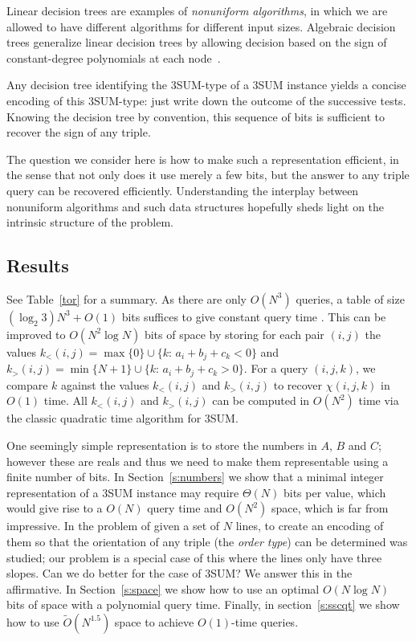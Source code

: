 Linear decision trees are examples of {\em nonuniform algorithms}, in which we
are allowed to have different algorithms for different input sizes.
Algebraic decision trees generalize linear decision trees
by allowing decision based on the sign of constant-degree polynomials at each
node~\cite{SY82}.

Any decision tree identifying the 3SUM-type of a 3SUM instance yields a concise
encoding of this 3SUM-type:
just write down the outcome of the successive tests. Knowing the decision tree
by convention, this sequence of bits is
sufficient to recover the sign of any triple.

The question we consider here is how to make such a representation efficient,
in the sense that not only does it use merely a few bits, but the answer to any
triple query can be recovered efficiently. Understanding the interplay between
nonuniform algorithms and such data structures hopefully sheds light on the
intrinsic structure of the problem.

\subsection{Results}

See Table~\ref{tor} for a summary. As there are only $O(N^3)$ queries, a table
of size $(\log_2 3) N^3 + O(1)$ bits suffices to give constant query time
\cite{DPT10}. This can be improved to $O(N^2\log N)$ bits of space by 
storing for each pair $(i,j)$ the values
\(k_<(i,j) = \max \{ 0\}\cup \{k \colon\, a_i + b_j + c_k < 0\}\) and
\(k_>(i,j) = \min \{ N+1\}\cup \{k \colon\, a_i + b_j + c_k > 0\}\).
For a query \((i,j,k)\), we compare \(k\) against the values \(k_<(i,j)\) and \(k_>(i,j)\)
to recover \(\chi(i,j,k)\) in \(O(1)\) time. All \(k_<(i,j)\) and \(k_>(i,j)\)
can be computed in \(O(N^2)\) time via the classic quadratic time algorithm for
3SUM.

One seemingly simple representation is to store the numbers in $A$, $B$ and
$C$; however these are reals and thus we need to make them representable using
a finite number of bits.
In Section~\ref{s:numbers} we show that a minimal integer representation of a
3SUM instance may require $\Theta(N)$ bits per value, which would give
rise to a $O(N)$ query time and $O(N^2)$ space, which is far from
impressive.
In \cite{CCILO18} the problem of given a set of $N$ lines, to create an
encoding of them so that the orientation of any triple (the \emph{order type})
can be determined was studied; our problem is a special case of this where the
lines only have three slopes.
Can we do better for the case of 3SUM? We answer this in the affirmative.
In Section~\ref{s:space} we show how to use an optimal $O(N \log N)$ bits of
space with a polynomial query time. Finally, in section~\ref{s:sscqt} we show
how to use $\tilde{O}(N^{1.5})$ space to achieve $O(1)$-time queries.

